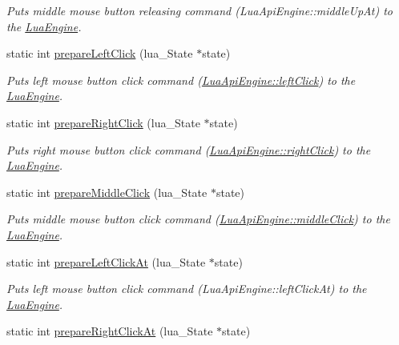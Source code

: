 \begin{DoxyCompactItemize}
\begin{DoxyCompactList}\small\item\em Puts middle mouse button releasing command (Lua\-Api\-Engine\-::middle\-Up\-At) to the \hyperlink{class_lua_engine}{Lua\-Engine}. \end{DoxyCompactList}\item 
static int \hyperlink{class_lua_api_engine_aa4ec049683c5ca8fe5b317f9daa80cf2}{prepare\-Left\-Click} (lua\-\_\-\-State $\ast$state)
\begin{DoxyCompactList}\small\item\em Puts left mouse button click command (\hyperlink{class_lua_api_engine_ae857b39d951f50a206989c3422cb5494}{Lua\-Api\-Engine\-::left\-Click}) to the \hyperlink{class_lua_engine}{Lua\-Engine}. \end{DoxyCompactList}\item 
static int \hyperlink{class_lua_api_engine_a516e303be81f5691e5963e6a470a0d6c}{prepare\-Right\-Click} (lua\-\_\-\-State $\ast$state)
\begin{DoxyCompactList}\small\item\em Puts right mouse button click command (\hyperlink{class_lua_api_engine_a7b3664b6f2593d3bd817edeee61a18e6}{Lua\-Api\-Engine\-::right\-Click}) to the \hyperlink{class_lua_engine}{Lua\-Engine}. \end{DoxyCompactList}\item 
static int \hyperlink{class_lua_api_engine_a4644c161b4336ff836816a8ecbed562e}{prepare\-Middle\-Click} (lua\-\_\-\-State $\ast$state)
\begin{DoxyCompactList}\small\item\em Puts middle mouse button click command (\hyperlink{class_lua_api_engine_a633c229323434db2d1af7f66c1517a34}{Lua\-Api\-Engine\-::middle\-Click}) to the \hyperlink{class_lua_engine}{Lua\-Engine}. \end{DoxyCompactList}\item 
static int \hyperlink{class_lua_api_engine_a2109f8d536e8238941ea3d5254feee6e}{prepare\-Left\-Click\-At} (lua\-\_\-\-State $\ast$state)
\begin{DoxyCompactList}\small\item\em Puts left mouse button click command (Lua\-Api\-Engine\-::left\-Click\-At) to the \hyperlink{class_lua_engine}{Lua\-Engine}. \end{DoxyCompactList}\item 
static int \hyperlink{class_lua_api_engine_ac5b06389118f48d5e320b81c3c5ba5d0}{prepare\-Right\-Click\-At} (lua\-\_\-\-State $\ast$state)

\end{DoxyCompactItemize}
